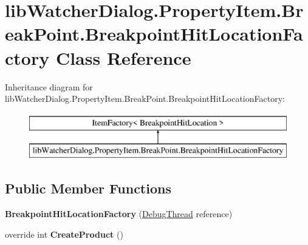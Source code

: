 \hypertarget{classlib_watcher_dialog_1_1_property_item_1_1_break_point_1_1_breakpoint_hit_location_factory}{\section{lib\+Watcher\+Dialog.\+Property\+Item.\+Break\+Point.\+Breakpoint\+Hit\+Location\+Factory Class Reference}
\label{classlib_watcher_dialog_1_1_property_item_1_1_break_point_1_1_breakpoint_hit_location_factory}
}
Inheritance diagram for lib\+Watcher\+Dialog.\+Property\+Item.\+Break\+Point.\+Breakpoint\+Hit\+Location\+Factory\+:\begin{figure}[H]
\begin{center}
\leavevmode
\includegraphics[height=2.000000cm]{classlib_watcher_dialog_1_1_property_item_1_1_break_point_1_1_breakpoint_hit_location_factory}
\end{center}
\end{figure}
\subsection*{Public Member Functions}
\begin{DoxyCompactItemize}
\item 
\hypertarget{classlib_watcher_dialog_1_1_property_item_1_1_break_point_1_1_breakpoint_hit_location_factory_a6bea0c4d60719cedc744064bd7f1bfdd}{{\bfseries Breakpoint\+Hit\+Location\+Factory} (\hyperlink{classlib_wather_debugger_1_1_thread_1_1_debug_thread}{Debug\+Thread} reference)}\label{classlib_watcher_dialog_1_1_property_item_1_1_break_point_1_1_breakpoint_hit_location_factory_a6bea0c4d60719cedc744064bd7f1bfdd}

\item 
\hypertarget{classlib_watcher_dialog_1_1_property_item_1_1_break_point_1_1_breakpoint_hit_location_factory_a4953631b1cc2881cdf774f80c546f2aa}{override int {\bfseries Create\+Product} ()}\label{classlib_watcher_dialog_1_1_property_item_1_1_break_point_1_1_breakpoint_hit_location_factory_a4953631b1cc2881cdf774f80c546f2aa}

\end{DoxyCompactItemize}

